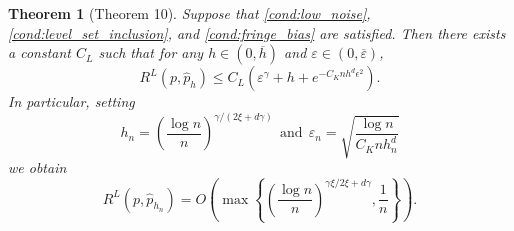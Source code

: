 \documentclass{article}
\newcommand{\set}[1]{\left\{#1\right\}}
\newcommand{\1}{\mathbb{I}}
\theoremstyle{alden}
\theoremstyle{aldenthm}
\newtheorem{theorem}{Theorem}
\theoremstyle{definition}
\theoremstyle{remark}
\begin{document}
\begin{theorem}[Theorem 10]
	Suppose that \ref{cond:low_noise},\ref{cond:level_set_inclusion}, and \ref{cond:fringe_bias} are satisfied. Then there exists a constant $C_L$ such that for any $h \in (0,\overline{h})$ and $\varepsilon \in (0,\overline{\varepsilon})$,
	\begin{equation*}
	R^L(p,\widehat{p}_h) \leq C_L(\varepsilon^{\gamma} + h + e^{-C_K n h^d \epsilon^2}).
	\end{equation*}
	In particular, setting
	\begin{equation*}
	h_n = \left(\frac{\log n}{n}\right)^{\gamma/(2 \xi + d \gamma)} ~~\textrm{and}~~ \varepsilon_n = \sqrt{\frac{\log n}{C_K n h_n^d}}
	\end{equation*}
	we obtain
	\begin{equation*}
	R^L(p, \widehat{p}_{h_n}) = O\left(\max\set{\left(\frac{\log n}{n}\right)^{\gamma \xi/2 \xi + d \gamma}, \frac{1}{n}}\right).
	\end{equation*}
\end{theorem}


\clearpage


\end{document}
